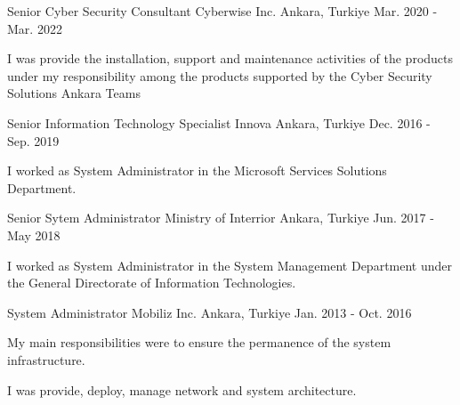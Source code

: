 \begin{cventries}
  \cventry
    {Senior Cyber Security Consultant} %
    {Cyberwise Inc.} %
    {Ankara, Turkiye} %
    {Mar. 2020 - Mar. 2022} %
    {
      \begin{cvitems} %
        \item {I was provide the installation, support and maintenance activities of the products under my responsibility among the products supported by the Cyber Security Solutions Ankara Teams}
      \end{cvitems}
    }
  \cventry
    {Senior Information Technology Specialist} %
    {Innova} %
    {Ankara, Turkiye} %
    {Dec. 2016 - Sep. 2019} %
    {
      \begin{cvitems} %
        \item {I worked as System Administrator in the Microsoft Services Solutions Department.}
      \end{cvitems}
    }
  \cventry
    {Senior Sytem Administrator} %
    {Ministry of Interrior} %
    {Ankara, Turkiye} %
    {Jun. 2017 - May 2018} %
    {
      \begin{cvitems} %
        \item {I worked as System Administrator in the System Management Department under the General Directorate of Information Technologies.}
      \end{cvitems}
    }
  \cventry
    {System Administrator} %
    {Mobiliz Inc.} %
    {Ankara, Turkiye} %
    {Jan. 2013 - Oct. 2016} %
    {
      \begin{cvitems} %
        \item {My main responsibilities were to ensure the permanence of the system infrastructure.}
        \item {I was provide, deploy, manage network and system architecture.}
      \end{cvitems} 
    }
\end{cventries}
